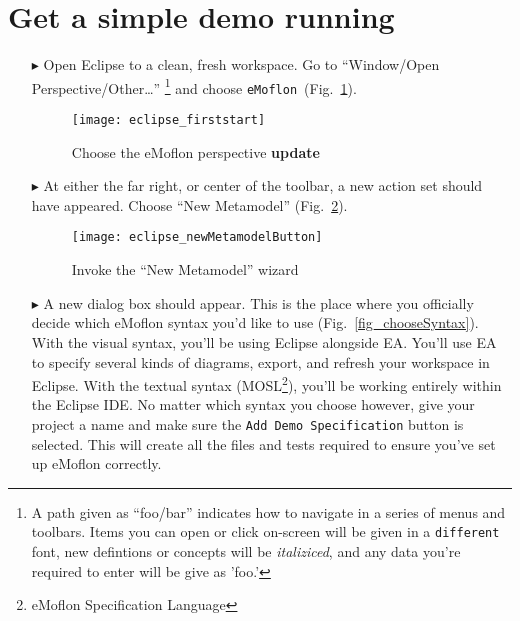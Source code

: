 \newpage
\genHeader

\section{Get a simple demo running}


\begin{itemize}
\hypertarget{simpleDemo common}{} 
\item[$\blacktriangleright$] Open Eclipse to a clean, fresh workspace. Go to ``Window/Open Perspective/Other\ldots''
\footnote{A path given as ``foo/bar'' indicates how to navigate in a series of menus and toolbars. Items you can open or click on-screen will be given in a
\texttt{different} font, new defintions or concepts will be \emph{italiziced}, and any data you're required to enter will be give as 'foo.'} and choose
\texttt{eMoflon}~(Fig.~\ref{fig_eclipse}).

\begin{figure}[htbp]
	\centering
  \texttt{[image: eclipse\_firststart]}
	\caption{Choose the eMoflon perspective {\bf update}}
	\label{fig_eclipse}
\end{figure} 

\item[$\blacktriangleright$] At either the far right, or center of the toolbar, a new action set should have appeared. Choose ``New Metamodel''
(Fig.~\ref{fig_eclipseNewMetamodelButton}).

\begin{figure}[htbp]
	\centering
  \texttt{[image: eclipse\_newMetamodelButton]}
	\caption{Invoke the ``New Metamodel'' wizard}
	\label{fig_eclipseNewMetamodelButton}
\end{figure}


\item[$\blacktriangleright$] A new dialog box should appear. This is the place where you officially decide which eMoflon syntax you'd like to use
(Fig.~\ref{fig_chooseSyntax}). With the visual syntax, you'll be using Eclipse alongside EA. You'll use EA to specify several kinds of diagrams, export, and
refresh your workspace in Eclipse. With the textual syntax (MOSL\footnote{eMoflon Specification Language}), you'll be working entirely within the Eclipse IDE.
No matter which syntax you choose however, give your project a name and make sure the \texttt{Add Demo Specification} button is selected. This will create all the
files and tests required to ensure you've set up eMoflon correctly.


\end{itemize}
